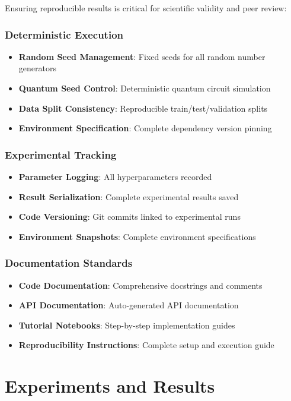 \documentclass[conference]{IEEEtran}
\begin{document}
Ensuring reproducible results is critical for scientific validity and peer review:

\subsubsection{Deterministic Execution}
\begin{itemize}
    \item \textbf{Random Seed Management}: Fixed seeds for all random number generators
    \item \textbf{Quantum Seed Control}: Deterministic quantum circuit simulation
    \item \textbf{Data Split Consistency}: Reproducible train/test/validation splits
    \item \textbf{Environment Specification}: Complete dependency version pinning
\end{itemize}

\subsubsection{Experimental Tracking}
\begin{itemize}
    \item \textbf{Parameter Logging}: All hyperparameters recorded
    \item \textbf{Result Serialization}: Complete experimental results saved
    \item \textbf{Code Versioning}: Git commits linked to experimental runs
    \item \textbf{Environment Snapshots}: Complete environment specifications
\end{itemize}

\subsubsection{Documentation Standards}
\begin{itemize}
    \item \textbf{Code Documentation}: Comprehensive docstrings and comments
    \item \textbf{API Documentation}: Auto-generated API documentation
    \item \textbf{Tutorial Notebooks}: Step-by-step implementation guides
    \item \textbf{Reproducibility Instructions}: Complete setup and execution guide
\end{itemize}

\section{Experiments and Results}
\label{sec:experiments}
\end{document}
